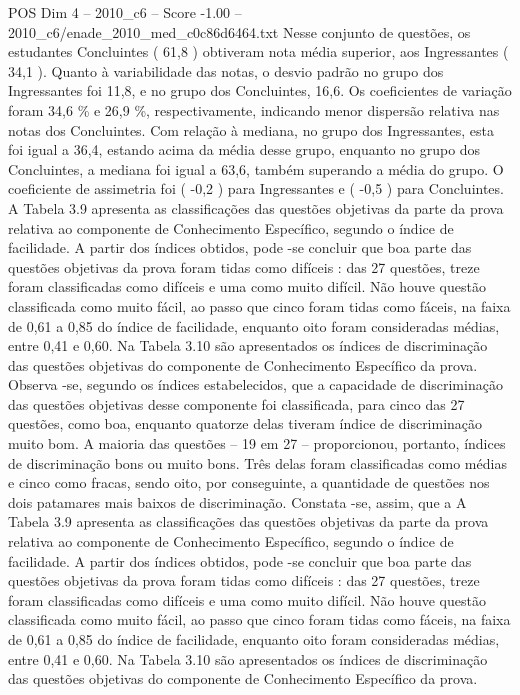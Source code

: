 \begin{textsample}{POS Dim 4 – 2010\_c6 – Score -1.00 – 2010\_c6/enade\_2010\_med\_c0c86d6464.txt}
Nesse conjunto de questões, os estudantes Concluintes ( 61,8 ) obtiveram nota média superior, aos Ingressantes ( 34,1 ).
Quanto à variabilidade das notas, o desvio padrão no grupo dos Ingressantes foi 11,8, e no grupo dos Concluintes, 16,6.
Os coeficientes de variação foram 34,6 \% e 26,9 \%, respectivamente, indicando menor dispersão relativa nas notas dos Concluintes.
Com relação à mediana, no grupo dos Ingressantes, esta foi igual a 36,4, estando acima da média desse grupo, enquanto no grupo dos Concluintes, a mediana foi igual a 63,6, também superando a média do grupo.
O coeficiente de assimetria foi ( -0,2 ) para Ingressantes e ( -0,5 ) para Concluintes.
A Tabela 3.9 apresenta as classificações das questões objetivas da parte da prova relativa ao componente de Conhecimento Específico, segundo o índice de facilidade.
A partir dos índices obtidos, pode -se concluir que boa parte das questões objetivas da prova foram tidas como difíceis : das 27 questões, treze foram classificadas como difíceis e uma como muito difícil.
Não houve questão classificada como muito fácil, ao passo que cinco foram tidas como fáceis, na faixa de 0,61 a 0,85 do índice de facilidade, enquanto oito foram consideradas médias, entre 0,41 e 0,60.
Na Tabela 3.10 são apresentados os índices de discriminação das questões objetivas do componente de Conhecimento Específico da prova.
Observa -se, segundo os índices estabelecidos, que a capacidade de discriminação das questões objetivas desse componente foi classificada, para cinco das 27 questões, como boa, enquanto quatorze delas tiveram índice de discriminação muito bom.
A maioria das questões – 19 em 27 – proporcionou, portanto, índices de discriminação bons ou muito bons.
Três delas foram classificadas como médias e cinco como fracas, sendo oito, por conseguinte, a quantidade de questões nos dois patamares mais baixos de discriminação.
Constata -se, assim, que a A Tabela 3.9 apresenta as classificações das questões objetivas da parte da prova relativa ao componente de Conhecimento Específico, segundo o índice de facilidade.
A partir dos índices obtidos, pode -se concluir que boa parte das questões objetivas da prova foram tidas como difíceis : das 27 questões, treze foram classificadas como difíceis e uma como muito difícil.
Não houve questão classificada como muito fácil, ao passo que cinco foram tidas como fáceis, na faixa de 0,61 a 0,85 do índice de facilidade, enquanto oito foram consideradas médias, entre 0,41 e 0,60.
Na Tabela 3.10 são apresentados os índices de discriminação das questões objetivas do componente de Conhecimento Específico da prova.

\end{textsample}
